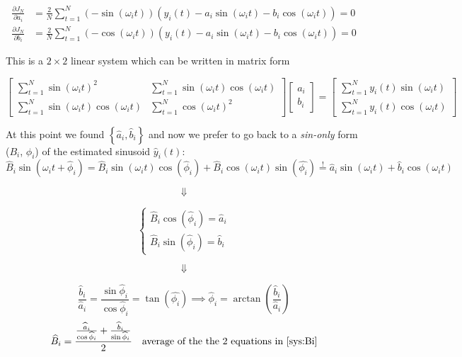 
\begin{align*}
    \frac{\partial J_N}{\partial a_i} &= \frac{2}{N} \sum_{t=1}^N (-\sin(\omega_it))(y_i(t) - a_i\sin(\omega_it)-b_i\cos(\omega_it)) = 0 \\
    \frac{\partial J_N}{\partial b_i} &= \frac{2}{N} \sum_{t=1}^N (-\cos(\omega_it))(y_i(t) - a_i\sin(\omega_it)-b_i\cos(\omega_it)) = 0
\end{align*}

This is a $2 \times 2$ linear system which can be written in matrix form

\[
    \begin{bmatrix}
        \sum_{t=1}^N \sin(\omega_it)^2 & \sum_{t=1}^N \sin(\omega_it)\cos(\omega_it) \\
        \sum_{t=1}^N \sin(\omega_it)\cos(\omega_it) & \sum_{t=1}^N \cos(\omega_it)^2
    \end{bmatrix}
    \begin{bmatrix}
        a_i \\ b_i
    \end{bmatrix} =
    \begin{bmatrix}
        \sum_{t=1}^N y_i(t)\sin(\omega_it) \\
        \sum_{t=1}^N y_i(t)\cos(\omega_it)
    \end{bmatrix}
\]

At this point we found $\left \{ \hat{a}_i, \hat{b}_i \right \}$ and now we prefer to go back to a \emph{sin-only} form ($B_i$, $\phi_i$) of the estimated sinusoid $\hat{y}_i(t)$:
\[
    \hat{B}_i\sin(\omega_it + \hat{\phi}_i) = \hat{B}_i\sin(\omega_it)\cos(\hat{\phi}_i) + \hat{B}_i\cos(\omega_it)\sin(\hat{\phi_i}) \stackrel{\text{!}}{=} \hat{a}_i\sin(\omega_it) + \hat{b}_i\cos(\omega_it)
\]

\[\Downarrow\]

\[
    \begin{cases}\label{sys:Bi}\tag{$\bigstar$}
         \hat{B}_i\cos(\hat{\phi}_i) = \hat{a}_i  \\
         \hat{B}_i\sin(\hat{\phi}_i) = \hat{b}_i 
    \end{cases}
\]

\[\Downarrow\]

\[
    \frac{\hat{b}_i}{\hat{a}_i} = \frac{\sin\hat{\phi}_i}{\cos{\hat{\phi}_i}} = \tan(\hat{\phi_i}) \implies \hat{\phi}_i = \arctan \left( \frac{\hat{b}_i}{\hat{a}_i} \right)
\]
\[
    \hat{B}_i = \frac{\frac{\hat{a}_i}{\cos\hat{\phi}_i} + \frac{\hat{b}_i}{\sin\hat{\phi}_i}}{2} \quad \text{average of the the 2 equations in \eqref{sys:Bi}}
\]

